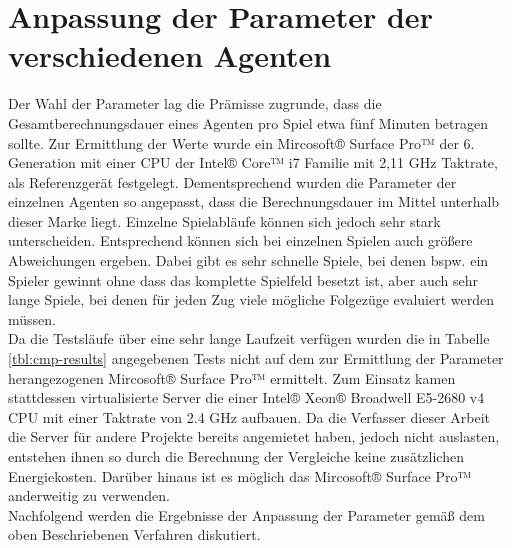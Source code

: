 \section{Anpassung der Parameter der verschiedenen Agenten}
Der Wahl der Parameter lag die Prämisse zugrunde, dass die Gesamtberechnungsdauer eines Agenten pro Spiel etwa fünf Minuten betragen sollte. Zur Ermittlung der Werte wurde ein  Mircosoft® Surface Pro™ der 6. Generation mit einer CPU der Intel® Core™ i7 Familie mit 2,11 GHz Taktrate, als Referenzgerät festgelegt. Dementsprechend wurden die Parameter der einzelnen Agenten so angepasst, dass die Berechnungsdauer im Mittel unterhalb dieser Marke liegt. Einzelne Spielabläufe können sich jedoch sehr stark unterscheiden. Entsprechend können sich bei einzelnen Spielen auch größere Abweichungen ergeben. Dabei gibt es sehr schnelle Spiele, bei denen bspw. ein Spieler gewinnt ohne dass das komplette Spielfeld besetzt ist, aber auch sehr lange Spiele, bei denen für jeden Zug viele mögliche Folgezüge evaluiert werden müssen.
\\Da die Testsläufe über eine sehr lange Laufzeit verfügen wurden die in Tabelle \ref{tbl:cmp-results} angegebenen Tests nicht auf dem zur Ermittlung der Parameter herangezogenen Mircosoft® Surface Pro™ ermittelt. Zum Einsatz kamen stattdessen virtualisierte Server die einer Intel® Xeon® Broadwell E5-2680 v4 CPU mit einer Taktrate von 2.4 GHz aufbauen. Da die Verfasser dieser Arbeit die Server für andere Projekte bereits angemietet haben, jedoch nicht auslasten, entstehen ihnen so durch die Berechnung der Vergleiche keine zusätzlichen Energiekosten. Darüber hinaus ist es möglich das Mircosoft® Surface Pro™ anderweitig zu verwenden.
\\Nachfolgend werden die Ergebnisse der Anpassung der Parameter gemäß dem oben Beschriebenen Verfahren diskutiert.
